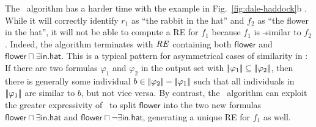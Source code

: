 The \el\ algorithm has a harder time with the example in
Fig.~\ref{fig:dale-haddock}b \cite{Stone1998a}.  While it will
correctly identify $r_1$ as ``the rabbit in the hat'' and $f_2$ as
``the flower in the hat'', it will not be able to compute a RE for $f_1$
because $f_1$ is \el-similar to $f_2$.  Indeed, the algorithm
terminates with $\mathit{RE}$ containing both $\mathsf{flower}$ and
$\mathsf{flower} \sqcap \exists \mathsf{in}.\mathsf{hat}$.  This is a
typical pattern for asymmetrical cases of similarity in \el: If there
are two formulas $\varphi_1$ and $\varphi_2$ in the output set with
$|\!|\varphi_1|\!| \subseteq |\!|\varphi_2|\!|$, then there is
generally some individual $b \in |\!|\varphi_2|\!| -
|\!|\varphi_1|\!|$ such that all individuals in $|\!|\varphi_1|\!|$
are similar to $b$, but not vice versa.  By contrast, the \alc\
algorithm can exploit the greater expressivity of \alc\ to split
$\mathsf{flower}$ into the two new formulas $\mathsf{flower} \sqcap
\exists \mathsf{in}.\mathsf{hat}$ and $\mathsf{flower} \sqcap \neg
\exists \mathsf{in}.\mathsf{hat}$, generating a unique RE for $f_1$ as
well.





